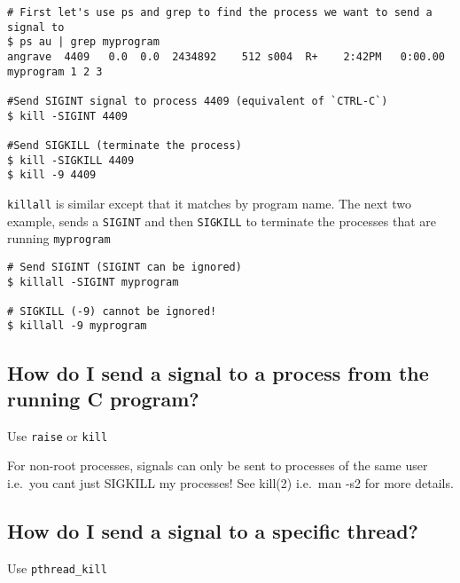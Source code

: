 \begin{verbatim}
# First let's use ps and grep to find the process we want to send a signal to
$ ps au | grep myprogram
angrave  4409   0.0  0.0  2434892    512 s004  R+    2:42PM   0:00.00 myprogram 1 2 3

#Send SIGINT signal to process 4409 (equivalent of `CTRL-C`)
$ kill -SIGINT 4409

#Send SIGKILL (terminate the process)
$ kill -SIGKILL 4409
$ kill -9 4409
\end{verbatim}

\texttt{killall} is similar except that it matches by program name. The
next two example, sends a \texttt{SIGINT} and then \texttt{SIGKILL} to
terminate the processes that are running \texttt{myprogram}

\begin{verbatim}
# Send SIGINT (SIGINT can be ignored)
$ killall -SIGINT myprogram

# SIGKILL (-9) cannot be ignored! 
$ killall -9 myprogram
\end{verbatim}

\subsection{How do I send a signal to a process from the running C
program?}\label{how-do-i-send-a-signal-to-a-process-from-the-running-c-program}

Use \texttt{raise} or \texttt{kill}

\begin{Shaded}
\begin{Highlighting}[]
  
  
\end{Highlighting}
\end{Shaded}

For non-root processes, signals can only be sent to processes of the
same user i.e.~you cant just SIGKILL my processes! See kill(2) i.e.~man
-s2 for more details.

\subsection{How do I send a signal to a specific
thread?}\label{how-do-i-send-a-signal-to-a-specific-thread}

Use \texttt{pthread\_kill}

